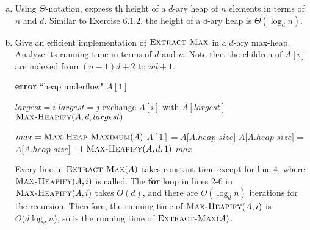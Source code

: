 \documentclass[12pt,reqno]{amsart}
\newif\ifanswer
\begin{document}
\begin{enumerate}[1.]
\begin{enumerate}[a.]
    \item Using $\Theta$-notation, express th height of a $d$-ary heap of $n$ elements in terms of $n$ and $d$.
    \ifanswer
    \noindent {\bf \\Solution}
    Similar to Exercise 6.1.2, the height of a $d$-ary heap is $\Theta(\log_d{n})$.

    \item Give an efficient implementation of $\textsc{Extract-Max}$ in a $d$-ary max-heap. Analyze its running time in terms of $d$ and $n$.
    \ifanswer
    \noindent {\bf \\Solution}
    Note that the children of $A[i]$ are indexed from $(n - 1)d + 2$ to $nd + 1$.
    \begin{algorithm}
        \caption{$\textsc{Max-Heap-Maximum}(A)$}
        \begin{algorithmic}[1]
                \STATE \textbf{error} ``heap underflow"
            \ENDIF
            \RETURN $A[1]$
        \end{algorithmic}
    \end{algorithm}

    \begin{algorithm}
        \caption{$\textsc{Max-Heapify}(A, d, i)$}
        \begin{algorithmic}[1]
            \STATE $largest = i$
                    \STATE $largest = j$
                \ENDIF
            \ENDFOR
                \STATE exchange $A[i]$ with $A[largest]$
                \STATE $\textsc{Max-Heapify}(A, d, largest)$
            \ENDIF
        \end{algorithmic}
    \end{algorithm}

    \begin{algorithm}
        \caption{$\textsc{Extract-Max}(A, d)$}
        \begin{algorithmic}[1]
            \STATE $max = \textsc{Max-Heap-Maximum}(A)$
            \STATE $A[1] = A[A.heap$-$size]$
            \STATE $A[A.heap$-$size]$ = $A[A.heap$-$size]$ - 1
            \STATE $\textsc{Max-Heapify}(A, d, 1)$
            \RETURN $max$
        \end{algorithmic}
    \end{algorithm}
    Every line in $\textsc{Extract-Max}(A)$ takes constant time except for line 4, where $\textsc{Max}$-$\textsc{Heapify}(A, i)$ is called. The \textbf{for} loop in lines 2-6 in $\textsc{Max-Heapify}(A, i)$ takes $O(d)$, and there are $O(\log_d{n})$ iterations for the recursion. Therefore, the running time of $\textsc{Max-Heapify}(A, i)$ is $O(d\log_d{n}$), so is the running time of $\textsc{Extract-Max}(A)$.
    

\end{enumerate}
\end{enumerate}
\end{document}
